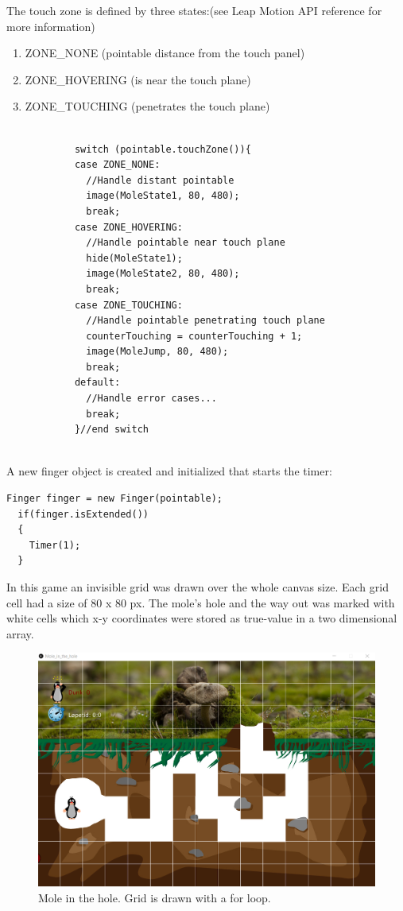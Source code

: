 The touch zone is defined by three states:(see Leap Motion API reference for more information)
\begin{enumerate}
    \item ZONE\_NONE (pointable distance from the touch panel)
    \item ZONE\_HOVERING (is near the touch plane)
    \item ZONE\_TOUCHING (penetrates the touch plane)
\end{enumerate}




\lstset{language=Java}
\begin{lstlisting}[caption = {Touch zone and mole state}, label={lst:Java}]

            switch (pointable.touchZone()){
            case ZONE_NONE:
              //Handle distant pointable
              image(MoleState1, 80, 480);
              break;
            case ZONE_HOVERING:
              //Handle pointable near touch plane
              hide(MoleState1);
              image(MoleState2, 80, 480);
              break;
            case ZONE_TOUCHING:
              //Handle pointable penetrating touch plane
              counterTouching = counterTouching + 1;
              image(MoleJump, 80, 480); 
              break;
            default:
              //Handle error cases...
              break;
            }//end switch
          
\end{lstlisting}

A new finger object is created and initialized that starts the timer:

\lstset{language=Java}
\begin{lstlisting}[caption = {Finger object, Gesture: extended finger}, label={lst:Java}]
  Finger finger = new Finger(pointable);
  if(finger.isExtended())
  {
    Timer(1);
  }
\end{lstlisting}

\break
In this game an invisible grid was drawn over the whole canvas size. Each grid cell had a size of 80 x 80 px. The mole’s hole and the way out was marked with white cells which x-y coordinates were stored as true-value in a two dimensional array.

\begin{figure}[h]  %
  \centering
  \includegraphics[width=.5\textwidth]{figures/Grid-processing-Mole_in_the_hole.png}
  \caption[Mole in the hole grid processing.]{Mole in the hole. Grid is drawn with a for loop.}
  \label{fig:grid-processing-Mole_in_the_hole}
\end{figure}

